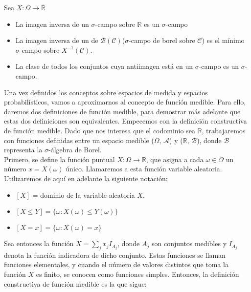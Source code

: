 \documentclass[12pt,a4paper]{book}
\begin{document}
\begin{lemma}
	Sea $X: \Omega \to \overline{\mathbb{R}}$
	\begin{itemize}
		\item La imagen inversa de un $\sigma$-campo sobre $\mathbb{R}$ es un $\sigma$-campo
		\item La imagen inversa de un de $\mathcal{B}(\mathcal{C})$($\sigma$-campo de borel sobre $\mathcal{C}$) es el mínimo $\sigma$-campo sobre $X^{-1}(\mathcal{C})$.
		\item La clase de todos los conjuntos cuya antiimagen está en un $\sigma$-campo es un $\sigma$-campo.
	\end{itemize}
\end{lemma}

Una vez definidos los conceptos sobre espacios de medida y espacios probabilísticos, vamos a aproximarnos al concepto de función medible. Para ello, daremos dos definiciones de función medible, para demostrar más adelante que estas dos definiciones son equivalentes. Empecemos con la definición constructiva de función medible. Dado que nos interesa que el codominio sea $\mathbb{R}$, trabajaremos con funciones definidas entre un espacio medible ($\Omega$, $\mathcal{A}$) y ($\mathbb{R}$, $\mathcal{B}$), donde $\mathcal{B}$ representa la $\sigma$-álgebra de Borel.\\

Primero, se define la función puntual $X: \Omega \to \mathbb{R}$, que asigna a cada $\omega \in \Omega$ un número $x = X(\omega)$ único. Llamaremos a esta función variable aleatoria. Utilizaremos de aquí en adelante la siguiente notación:

\begin{itemize}
\item $[X]$ = dominio de la variable aleatoria $X$.
\item $[ X \leq Y] = \{\omega: X(\omega) \leq Y(\omega)\}$
\item $[ X = x] = \{\omega: X(\omega)= x\}$
\end{itemize}

Sea entonces la función $X = \displaystyle \sum_j x_jI_{A_j}$, donde $A_j$ son conjuntos medibles y $I_{A_j}$ denota la función indicadora de dicho conjunto. Estas funciones se llaman funciones elementales, y cuando el número de valores distintos que toma la función $X$ es finito, se conocen como funciones simples. Entonces, la definición constructiva de función medible es la que sigue:\\
\end{document}
